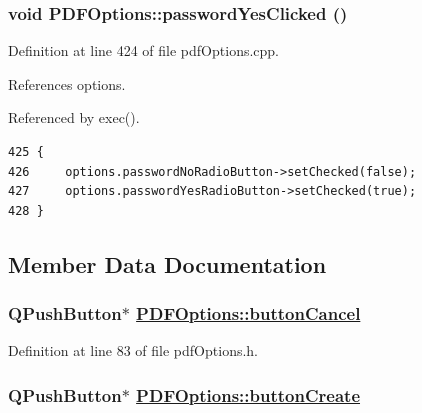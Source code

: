 \hypertarget{classPDFOptions_k2}{
\subsubsection[passwordYesClicked]{\setlength{\rightskip}{0pt plus 5cm}void PDFOptions::password\-Yes\-Clicked ()}}
\label{classPDFOptions_k2}


Definition at line 424 of file pdf\-Options.cpp.

References options.

Referenced by exec().

\footnotesize\begin{verbatim}425 {
426     options.passwordNoRadioButton->setChecked(false);
427     options.passwordYesRadioButton->setChecked(true);
428 }
\end{verbatim}\normalsize 




\subsection{Member Data Documentation}
\hypertarget{classPDFOptions_r42}{
\subsubsection[buttonCancel]{\setlength{\rightskip}{0pt plus 5cm}QPush\-Button$\ast$ \hyperlink{classPDFOptions_r42}{PDFOptions::button\-Cancel}}}
\label{classPDFOptions_r42}


Definition at line 83 of file pdf\-Options.h.\hypertarget{classPDFOptions_r41}{
\subsubsection[buttonCreate]{\setlength{\rightskip}{0pt plus 5cm}QPush\-Button$\ast$ \hyperlink{classPDFOptions_r41}{PDFOptions::button\-Create}}}
\label{classPDFOptions_r41}


